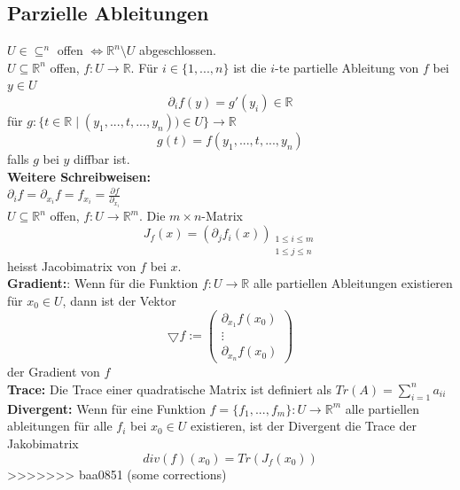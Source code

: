 \subsection{Parzielle Ableitungen}
    $U\in\subseteq^n$ offen $\iff \mathbb R^n\setminus U$ abgeschlossen.\\
    $U\subseteq\mathbb R^n$ offen, $f:U\rightarrow\mathbb R$. Für
    $i\in\{1,...,n\}$ ist die $i$-te partielle Ableitung von $f$ bei $y\in U$
    $$\partial_if(y)=g'(y_i)\in\mathbb R$$ für $g:\{t\in\mathbb
    R\mid(y_1,...,t,...,y_n))\in U\}\rightarrow\mathbb R$
    $$g(t)=f(y_1,...,t,...,y_n)$$ falls $g$ bei $y$ diffbar ist.\\
    \textbf{Weitere Schreibweisen:}\\
    $\partial_if=\partial_{x_i}f=f_{x_i}=\frac{\partial f}{\partial_{x_i}}$\\
    $U\subseteq\mathbb R^n$ offen, $f:U\rightarrow\mathbb R^m$. Die $m\times
    n$-Matrix $$J_f(x)=(\partial_jf_i(x))_{\substack{1\leq i\leq m\\1\leq j\leq
    n}}$$
    heisst Jacobimatrix von $f$ bei $x$.\\
  \textbf{Gradient:}: Wenn für die Funktion $f:U\rightarrow \mathbb R$ alle 
  partiellen Ableitungen existieren für $x_0\in U$, dann ist der Vektor 
  $$\bigtriangledown
  f:=\begin{pmatrix}\partial_{x_1}f(x_0)\\\vdots\\\partial_{x_n}f(x_0)\end{pmatrix}$$
  der Gradient von $f$\\
  \textbf{Trace:} Die Trace einer quadratische Matrix ist definiert als $Tr(A)=\sum\limits_{i=1}^n a_{ii}$\\
  \textbf{Divergent:} Wenn für eine Funktion $f=\{f_1,...,f_m\}:U\rightarrow\mathbb R^m$ alle partiellen ableitungen für alle $f_i$ bei $x_0\in U$ existieren, ist der Divergent die Trace der Jakobimatrix $$div(f)(x_0)=Tr(J_f(x_0))$$
>>>>>>> baa0851 (some corrections)
